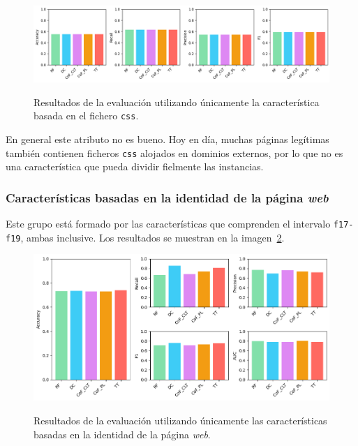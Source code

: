 \begin{figure}[h]
	\caption[\textit{Phishing}: detección (\texttt{f16})]{Resultados de la evaluación utilizando únicamente la característica basada en el fichero \texttt{css}.}
	\centering
	\includegraphics[width=\textwidth]{../img/memoria/5_phishing/f16_small}
	\label{gr:ph-f16_small}
\end{figure}

En general este atributo no es bueno. Hoy en día, muchas páginas legítimas también contienen ficheros \texttt{css} alojados en dominios externos, por lo que no es una característica que pueda dividir fielmente las instancias.

\subsubsection{Características basadas en la identidad de la página \textit{web}}
Este grupo está formado por las características que comprenden el intervalo \texttt{f17-f19}, ambas inclusive. Los resultados se muestran en la imagen~\ref{gr:ph-f17f19_small}.

\begin{figure}[h]
	\caption[\textit{Phishing}: detección (\texttt{f17-f19})]{Resultados de la evaluación utilizando únicamente las características basadas en la identidad de la página \textit{web}.}
	\centering
	\includegraphics[width=\textwidth]{../img/memoria/5_phishing/f17f19_big}
	\label{gr:ph-f17f19_small}
\end{figure}

